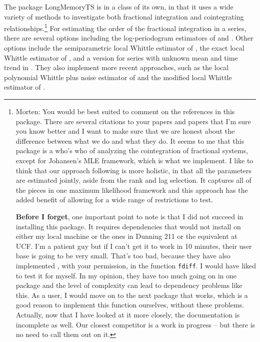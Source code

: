 \documentclass[11pt,letterpaper]{paper}
\newcommand{\pkg}[1]{{\normalfont\fontseries{b}\selectfont #1}}
\let\fct=\texttt
\begin{document}
The package \pkg{LongMemoryTS} is in a class of its own, in that it uses a wide variety of methods to investigate both fractional integration and cointegrating relationships.\footnote{Morten: You would be best suited to comment on the references in this package. 
There are several citations to your papers and papers that I'm sure you know better and I want to make sure that we are honest about the difference between what we do and what they do. 
It seems to me that this package is a who's who of analyzing the cointegration of fractional systems, except for Johansen's MLE framework, which is what we implement.
I like to think that our approach following \citet{Johansen1995} is more holistic, in that all the parameters are estimated jointly, aside from the rank and lag selection. 
It captures all of the pieces in one maximum likelihood framework and this approach has the added benefit of allowing for a wide range of restrictions to test. 

\textbf{Before I forget}, one important point to note is that I did not succeed in installing this package. 
It requires dependencies that would not install on either my local machine or the ones in Dunning 211 or the equivalent at UCF. 
I'm a patient guy but if I can't get it to work in 10 minutes, their user base is going to be very small. 
That's too bad, because they have also implemented \cite{Jensen2014}, with your permission, in the function \fct{fdiff}. I would have liked to test it for myself. 
In my opinion, they have too much going on in one package and the level of complexity can lead to dependency problems like this. 
As a user, I would move on to the next package that works, which is a good reason to implement this function ourselves, without these problems. 
Actually, now that I have looked at it more closely, the documentation is incomplete as well. 
Our closest competitor is a work in progress -- but there is no need to call them out on it. } 
% 
For estimating the order of the fractional integration in a series, there are several options including the log-periodogram estimators of \citet{GPH1983} and \citet{RobinsonPM1995b}. 
% 
Other options include the semiparametric local Whittle estimator of \citet{RobinsonPM1995a},
the exact local Whittle estimator of \citet{ShimotsuPhillips2005}, 
and a version for series with unknown mean and time trend in \citet{Shimotsu2010}. 
They also implement more recent approaches, such as 
the local polynomial Whittle plus noise estimator of \citet{FredNielsenNielsen2012} 
and the modified local Whittle estimator of \citet{HouPerron2014}. 
\end{document}
